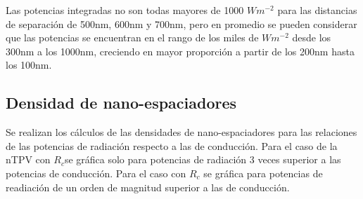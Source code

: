 Las potencias integradas no son todas mayores de 1000 $Wm^{-2}$ para las distancias de separación de 500nm, 600nm y 700nm, pero en promedio se pueden considerar que las potencias se encuentran en el rango de los miles de $Wm^{-2}$ desde los 300nm a los 1000nm, creciendo en mayor proporción a partir de los 200nm hasta los 100nm.
\subsection{Densidad de nano-espaciadores}
Se realizan los cálculos de las densidades de nano-espaciadores para las relaciones de las potencias de radiación respecto a las de conducción. Para el caso de la nTPV con $R_c$se gráfica solo para potencias de radiación 3 veces superior a las potencias de conducción. Para el caso con $R_c$ se gráfica para potencias de readiación de un orden de magnitud superior a las de conducción.
